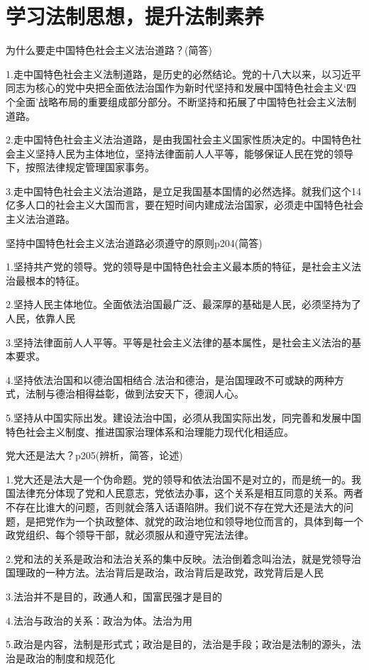 \documentclass[lang=cn,10pt]{elegantbook}
\begin{document}
	\chapter{学习法制思想，提升法制素养}
	\begin{example}
		为什么要走中国特色社会主义法治道路？(简答)
	\end{example}
	\begin{solution}
		
		1.走中国特色社会主义法制道路，是历史的必然结论。党的十八大以来，以习近平同志为核心的党中央把全面依法治国作为新时代坚持和发展中国特色社会主义‘四个全面’战略布局的重要组成部分部分。不断坚持和拓展了中国特色社会主义法制道路。
		
		2.走中国特色社会主义法治道路，是由我国社会主义国家性质决定的。中国特色社会主义坚持人民为主体地位，坚持法律面前人人平等，能够保证人民在党的领导下，按照法律规定管理国家事务。
		
		3.走中国特色社会主义法治道路，是立足我国基本国情的必然选择。就我们这个14亿多人口的社会主义大国而言，要在短时间内建成法治国家，必须走中国特色社会主义法治道路。
	\end{solution}
	\begin{example}
		坚持中国特色社会主义法治道路必须遵守的原则p204(简答)
	\end{example}
	\begin{solution}
		
		1.坚持共产党的领导。党的领导是中国特色社会主义最本质的特征，是社会主义法治最根本的特征。
		
		2.坚持人民主体地位。全面依法治国最广泛、最深厚的基础是人民，必须坚持为了人民，依靠人民
		
		3.坚持法律面前人人平等。平等是社会主义法律的基本属性，是社会主义法治的基本要求。
		
		4.坚持依法治国和以德治国相结合.法治和德治，是治国理政不可或缺的两种方式，法制与德治相得益彰，做到法安天下，德润人心。
		
		5.坚持从中国实际出发。建设法治中国，必须从我国实际出发，同完善和发展中国特色社会主义制度、推进国家治理体系和治理能力现代化相适应。
	\end{solution}
	\begin{example}
		
		党大还是法大？p205(辨析，简答，论述)
	\end{example}
	\begin{solution}
		
		1.党大还是法大是一个伪命题。党的领导和依法治国不是对立的，而是统一的。我国法律充分体现了党和人民意志，党依法办事，这个关系是相互同意的关系。两者不存在比谁大的问题，否则就会落入话语陷阱。我们说不存在党大还是法大的问题，是把党作为一个执政整体、就党的政治地位和领导地位而言的，具体到每一个政党组织、每个领导干部，就必须服从和遵守宪法法律。
		
		2.党和法的关系是政治和法治关系的集中反映。法治倒着念叫治法，就是党领导治国理政的一种方法。法治背后是政治，政治背后是政党，政党背后是人民
		
		3.法治并不是目的，政通人和，国富民强才是目的
		
		4.法治与政治的关系：政治为体。法治为用
		
		5.政治是内容，法制是形式式；政治是目的，法治是手段；政治是法制的源头，法治是政治的制度和规范化
	\end{solution}
\end{document}
